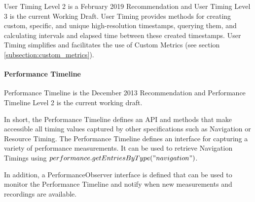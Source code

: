 User Timing Level 2 is a February 2019 Recommendation and User Timing Level 3 is the current Working Draft.
User Timing provides methods for creating custom, specific, and unique high-resolution timestamps, querying them, and calculating intervals and elapsed time between these created timestamps. %
User Timing simplifies and facilitates the use of Custom Metrics (see section \ref{subsection:custom_metrics}).




\paragraph{Performance Timeline} %

Performance Timeline is the December 2013 Recommendation %
and Performance Timeline Level 2 is the current working draft. %

In short, the Performance Timeline defines an API and methods that make accessible all timing values captured by other specifications such as Navigation or Resource Timing.
The Performance Timeline defines an interface for capturing a variety of performance measurements. 
It can be used to retrieve Navigation Timings using $performance.getEntriesByType("navigation")$.

In addition, a PerformanceObserver interface is defined that can be used to monitor the Performance Timeline and notify when new measurements and recordings are available.



